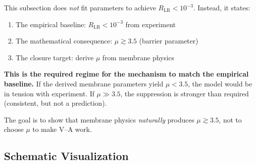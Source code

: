 \begin{tcolorbox}[colback=green!5!white, colframe=green!60!black,
    title=\textbf{Reader Takeaway: Not a Fit, but a Closure Target}]
\label{box:va_takeaway}

This subsection does \emph{not} fit parameters to achieve $R_{\text{LR}} < 10^{-3}$.
Instead, it states:
\begin{enumerate}[nosep]
    \item The empirical baseline: $R_{\text{LR}} < 10^{-3}$ from experiment \tagBL{}
    \item The mathematical consequence: $\mu \gtrsim 3.5$ (barrier parameter)
    \item The closure target: derive $\mu$ from membrane physics \tagOPEN{}
\end{enumerate}

\textbf{This is the required regime for the mechanism to match the empirical
baseline.} If the derived membrane parameters yield $\mu < 3.5$, the model
would be in tension with experiment. If $\mu \gg 3.5$, the suppression is
stronger than required (consistent, but not a prediction).

The goal is to show that membrane physics \emph{naturally} produces $\mu \gtrsim 3.5$,
not to choose $\mu$ to make V--A work.
\end{tcolorbox}


\subsection{Schematic Visualization}

